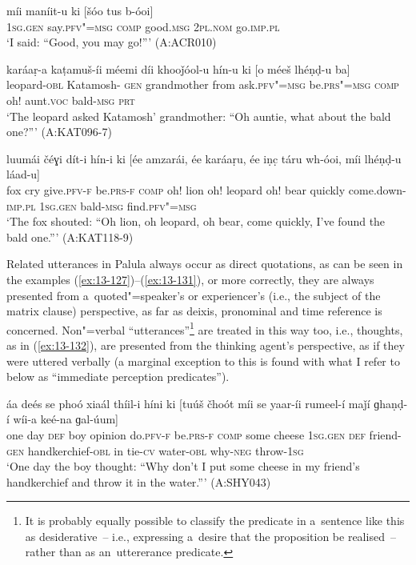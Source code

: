 \begin{exe}
\ex
\label{ex:13-129}
\gll míi maníit-u ki [šóo tus b-óoi]  \\
\textsc{1sg.gen} say.\textsc{pfv"=msg} \textsc{comp} good.\textsc{msg} \textsc{2pl.nom} go.\textsc{imp.pl} \\
\glt `I said: ``Good, you may go!''' (A:ACR010)

\ex
\label{ex:13-130}
\gll karáaṛ-a kaṭamuš-íi méemi díi  khooǰóol-u hín-u ki [o méeš  lhéṇḍ-u ba] \\
leopard-\textsc{obl} Katamosh-\textsc{ gen} grandmother from  ask.\textsc{pfv"=msg} be.\textsc{prs"=msg} \textsc{comp} oh! aunt.\textsc{voc}  bald-\textsc{msg} \textsc{prt } \\
\glt `The leopard asked Katamosh' grandmother: ``Oh auntie, what about the bald one?''' (A:KAT096-7)

\ex
\label{ex:13-131}
\gll luumái čéɣi dít-i hín-i ki [ée amzarái,  ée karáaṛu,
  ée iṇc̣ táru wh-óoi, míi  lhéṇḍ-u láad-u] \\
fox cry give.\textsc{pfv-f} be.\textsc{prs-f} \textsc{comp} oh! lion  oh! leopard oh! bear quickly come.down-\textsc{imp.pl} \textsc{1sg.gen} bald-\textsc{msg} find.\textsc{pfv"=msg}  \\
\glt `The fox shouted: ``Oh lion, oh leopard, oh bear, come quickly, I've found the bald one.''' (A:KAT118-9) 
\end{exe}

Related utterances in Palula always occur as direct quotations, as can be seen in the examples (\ref{ex:13-127})--(\ref{ex:13-131}), or more correctly, they are always presented from a~quoted"=speaker's or experiencer's (i.e., the subject of the matrix clause) perspective, as far as deixis, pronominal and time reference is concerned. Non"=verbal ``utterances''\footnote{It is probably equally possible to classify the predicate in a~sentence like this as desiderative~-- i.e., expressing a~desire that the proposition be realised~-- rather than as an~uttererance predicate.} are treated in this way too, i.e., thoughts, as in (\ref{ex:13-132}), are presented from the thinking agent's perspective, as if they were uttered verbally (a marginal exception to this is found with what I refer to below as ``immediate perception predicates''). 

\begin{exe}
\ex
\label{ex:13-132}
\gll áa deés se phoó xiaál thíil-i híni ki  [tuúš čhoót míi
  se yaar-íi rumeel-í  maǰí ɡhaṇḍ-í wíi-a keé-na ɡal-úum] \\
one day \textsc{def} boy opinion do.\textsc{pfv-f} be.\textsc{prs-f} \textsc{comp}   some cheese \textsc{1sg.gen} \textsc{def} friend-\textsc{gen} handkerchief-\textsc{obl}  in tie-\textsc{cv} water-\textsc{obl} why-\textsc{neg} throw-\textsc{1sg} \\
\glt `One day the boy thought: ``Why don't I put some cheese in my friend's handkerchief and throw it in the water.''' (A:SHY043)
\end{exe}


